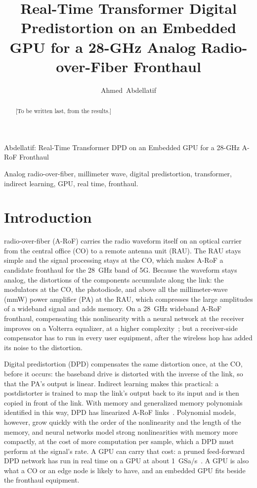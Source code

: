 \documentclass[journal]{IEEEtran}
\newcommand{\tbd}[1]{{\color{red!75!black}[#1]}}
\begin{document}
\title{Real-Time Transformer Digital Predistortion on an Embedded GPU for a 28-GHz Analog
Radio-over-Fiber Fronthaul}

\author{Ahmed~Abdellatif}

%
{Abdellatif: Real-Time Transformer DPD on an Embedded GPU for a 28-GHz A-RoF Fronthaul}

\maketitle

\begin{abstract}
\tbd{To be written last, from the results.}
\end{abstract}

\begin{IEEEkeywords}
Analog radio-over-fiber, millimeter wave, digital predistortion, transformer, indirect learning,
GPU, real time, fronthaul.
\end{IEEEkeywords}

\section{Introduction}\label{sec:intro}

 radio-over-fiber (A-RoF) carries the radio waveform itself on an optical
carrier from the central office (CO) to a remote antenna unit (RAU). The RAU stays simple and the
signal processing stays at the CO, which makes A-RoF a candidate fronthaul for the
\SI{28}{GHz} band of 5G. Because the waveform stays
analog, the distortions of the components accumulate along the link: the modulators at the CO, the
photodiode, and above all the millimeter-wave (mmW) power amplifier (PA) at the RAU, which
compresses the large amplitudes of a wideband signal and adds memory. On a \SI{28}{GHz} wideband
A-RoF fronthaul, compensating this nonlinearity with a neural network at the receiver improves on a
Volterra equalizer, at a higher complexity~\cite{song2024}; but a receiver-side compensator has to
run in every user equipment, after the wireless hop has added its noise to the distortion.

Digital predistortion (DPD) compensates the same distortion once, at the CO, before it occurs: the
baseband drive is distorted with the inverse of the link, so that the PA's output is linear.
Indirect learning makes this practical: a postdistorter is trained to map the link's output back to
its input and is then copied in front of the link. With memory and generalized memory polynomials
identified in this way, DPD has linearized A-RoF links~\cite{hadi2019}. Polynomial models, however,
grow quickly with the order of the nonlinearity and the length of the memory, and neural networks
model strong nonlinearities with memory more compactly, at the cost of more computation per sample,
which a DPD must perform at the signal's rate. A GPU can carry that cost: a pruned feed-forward DPD
network has run in real time on a GPU at about \SI{1}{GSa/s}~\cite{li2025}. A GPU is also what a CO
or an edge node is likely to have, and an embedded GPU fits beside the fronthaul equipment.
\end{document}
